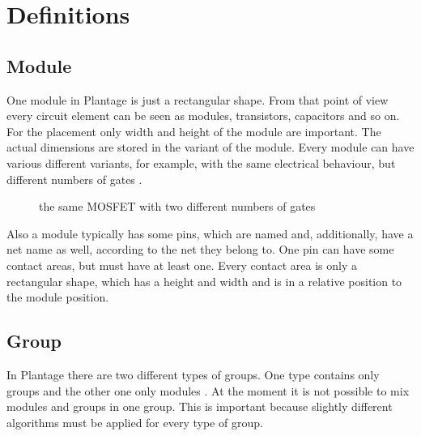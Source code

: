 \chapter{Definitions}

\section{Module}
One module in Plantage is just a rectangular shape. From that point of view every circuit element can be seen as modules, transistors, capacitors and so on. For the placement only width and height of the module are important. The actual dimensions are stored in the variant of the module. Every module can have various different variants, for example, with the same electrical behaviour, but different numbers of gates .

\begin{figure}
	\centering
	
	\caption{the same MOSFET with two different numbers of gates}
	\label{fig:modules_with_different_gate_number}
\end{figure}

Also a module typically has some pins, which are named and, additionally, have a net name as well, according to the net they belong to. One pin can have some contact areas, but must have at least one. Every contact area is only a rectangular shape, which has a height and width and is in a relative position to the module position.

\section{Group}
In Plantage there are two different types of groups. One type contains only groups and the other one only modules . At the moment it is not possible to mix modules and groups in one group. This is important because slightly different algorithms must be applied for every type of group.

